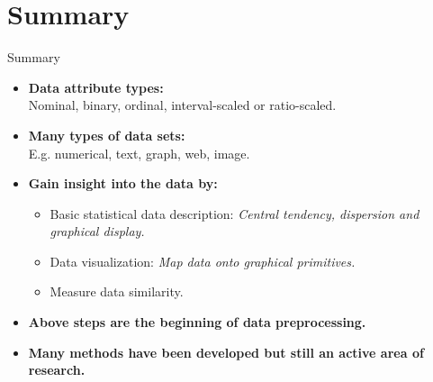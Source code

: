 \section{Summary}

\begin{frame}{Summary}
  \centering
  \begin{itemize}
  \item \textbf{Data attribute types:}\\
    Nominal, binary, ordinal, interval-scaled or ratio-scaled.
  \item \textbf{Many types of data sets:}\\
    E.g. numerical, text, graph, web, image.
  \item \textbf{Gain insight into the data by:}
    \begin{itemize}
    \item Basic statistical data description: \emph{Central tendency, dispersion and graphical display.}
    \item Data visualization: \emph{Map data onto graphical primitives.}
    \item Measure data similarity.
    \end{itemize}
  \item \textbf{Above steps are the beginning of data preprocessing.}
  \item \textbf{Many methods have been developed but still an active area of research.}
  \end{itemize}
\end{frame}